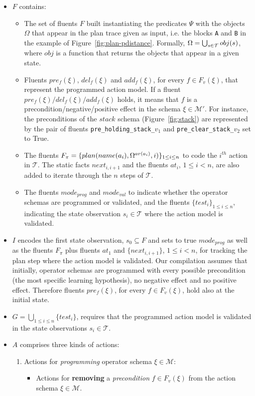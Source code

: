 \documentclass[letterpaper]{article} %
\begin{document}
\begin{itemize}
\item $F$ contains:
\begin{itemize}
\item The set of fluents $F$ built instantiating the predicates $\Psi$ with the objects $\Omega$ that appear in the plan trace given as input, i.e. the blocks {\tt\small A} and {\tt\small B} in the example of Figure~\ref{fig:plan-pdistance}. Formally, $\Omega=\bigcup_{\small s\in\mathcal{T}} obj(s)$, where $obj$ is a function that returns the objects that appear in a given state.
\item Fluents $pre_f(\xi)$, $del_f(\xi)$ and $add_f(\xi)$, for every $f\in F_v(\xi)$, that represent the programmed action model. If a fluent $pre_f(\xi)/del_f(\xi)/add_f(\xi)$ holds, it means that $f$ is a precondition/negative/positive effect in the schema $\xi\in \mathcal{M}'$. For instance, the preconditions of the $stack$ schema (Figure~\ref{fig:stack}) are represented by the pair of fluents {\small\tt pre\_holding\_stack\_$v_1$} and {\small\tt pre\_clear\_stack\_$v_2$} set to True.
\item The fluents $F_{\pi}=\{plan(name(a_i),\Omega^{ar(a_i)},i)\}_{\small 1\leq i\leq n}$ to code the $i^{th}$ action in $\mathcal{T}$. The static facts $next_{i,i+1}$ and the fluents $at_i$, {\small $1\leq i< n$}, are also added to iterate through the $n$ steps of $\mathcal{T}$.
\item The fluents $mode_{prog}$ and $mode_{val}$ to indicate whether the operator schemas are programmed or validated, and the fluents $\{test_i\}_{1\leq i\leq n}$, indicating the state observation $s_i\in\mathcal{T}$ where the action model is validated.
\end{itemize}
\item $I$ encodes the first state observation, $s_0\subseteq F$ and sets to true $mode_{prog}$ as well as the fluents $F_{\pi}$ plus fluents $at_1$ and $\{next_{i,i+1}\}$, {\small $1\leq i<n$}, for tracking the plan step where the action model is validated. Our compilation assumes that initially, operator schemas are programmed with every possible precondition (the most specific learning hypothesis), no negative effect and no positive effect. Therefore fluents $pre_f(\xi)$, for every $f\in F_v(\xi)$, hold also at the initial state.

\item $G=\bigcup_{1\leq i\leq n}\{test_i\}$, requires that the programmed action model is validated in the state observations $s_i\in\mathcal{T}$.
\item $A$ comprises three kinds of actions:
\begin{enumerate}
\item Actions for {\em programming} operator schema $\xi\in\mathcal{M}$:
\begin{itemize}
\item Actions for {\bf removing} a {\em precondition} $f\in F_v(\xi)$ from the action schema $\xi\in\mathcal{M}$.


\end{itemize}
\end{enumerate}
\end{itemize}
\end{document}
